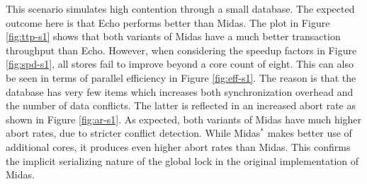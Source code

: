 This scenario simulates high contention through a small database. The expected
outcome here is that Echo performs better than Midas. The plot in Figure
\ref{fig:ttp-s1} shows that both variants of Midas have a much better
transaction throughput than Echo. However, when considering the speedup factors
in Figure \ref{fig:spd-s1}, all stores fail to improve beyond a core count of
eight. This can also be seen in terms of parallel efficiency in Figure
\ref{fig:eff-s1}. The reason is that the database has very few items which
increases both synchronization overhead and the number of data conflicts. The
latter is reflected in an increased abort rate as shown in Figure
\ref{fig:ar-s1}. As expected, both variants of Midas have much higher abort
rates, due to stricter conflict detection. While Midas$^{*}$ makes better use of
additional cores, it produces even higher abort rates than Midas. This confirms
the implicit serializing nature of the global lock in the original
implementation of Midas.

